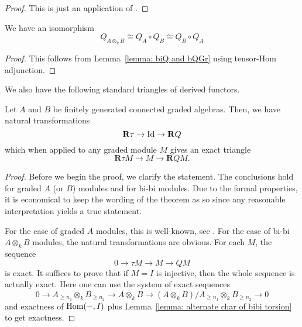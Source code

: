 \begin{proof}
  This is just an application of \textcite[Cor. 1, III.3]{DCA62}.
\end{proof}

\begin{corollary}\label{corollary: relation on Qs}
  We have an isomorphism 
  \begin{displaymath}
    Q_{A \otimes_k B} \cong Q_A \circ Q_B \cong Q_B \circ Q_A
  \end{displaymath}
\end{corollary}

\begin{proof}
  This follows from Lemma~\ref{lemma: biQ and bQGr} using tensor-Hom adjunction. 
\end{proof}

We also have the following standard triangles of derived functors. 

\begin{lemma} \label{lemma: exact triangles}
    Let \(A\) and \(B\) be finitely generated connected graded algebras. Then, we have natural transformations 
  \begin{displaymath}
    \mathbf{R} \tau \to \operatorname{Id} \to \mathbf{R} Q 
  \end{displaymath}
  which when applied to any graded module \(M\) gives an exact triangle 
  \begin{displaymath}
    \mathbf{R} \tau M \to M \to \mathbf{R} Q M.
  \end{displaymath}
\end{lemma}

\begin{proof}
  Before we begin the proof, we clarify the statement. The conclusions hold for graded \(A\) (or \(B\)) modules and for bi-bi modules. Due to the formal properties, it is economical to keep the wording of the theorem as so since any reasonable interpretation yields a true statement. 
  
  For the case of graded \(A\) modules, this is well-known, see \textcite[Property 4.6]{BVdB}. For the case of bi-bi \(A \otimes_k B\) modules, the natural transformations are obvious. For each \(M\), the sequence 
  \begin{displaymath}
    0 \to \tau M \to M \to Q M
  \end{displaymath}
  is exact. It suffices to prove that if \(M = I\) is injective, then the whole sequence is actually exact. Here one can use the system of exact sequences
  \begin{displaymath}
    0 \to A_{\geq n_1} \otimes_k B_{\geq n_2} \to A \otimes_k B \to (A \otimes_k B) / A_{\geq n_1} \otimes_k B_{\geq n_2} \to 0
  \end{displaymath}
  and exactness of \(\operatorname{Hom}(-,I)\) plus Lemma~\ref{lemma: alternate char of bibi torsion} to get exactness. 
\end{proof}
